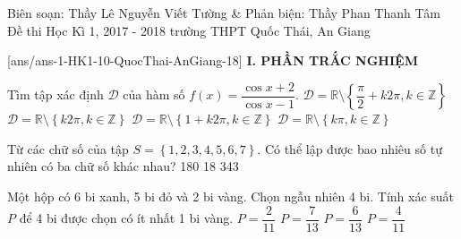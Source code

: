 
	\begin{name}
{Biên soạn: Thầy Lê Nguyễn Viết Tường \& Phản biện: Thầy Phan Thanh Tâm}
		{Đề thi Học Kì 1, 2017 - 2018 trường THPT Quốc Thái, An Giang}
	\end{name}
	\setcounter{ex}{0}\setcounter{bt}{0}
	[ans/ans-1-HK1-10-QuocThai-AnGiang-18]
\noindent\textbf{I. PHẦN TRẮC NGHIỆM}
\begin{ex}%
Tìm tập xác định $\mathscr D$ của hàm số $f(x)=\dfrac{\cos x+2}{\cos x-1}$.
\choice
{$\mathscr D=\mathbb{R} \setminus \left\{\dfrac{\pi}{2}+k2\pi,k\in \mathbb{Z}\right\}$}
{\True $\mathscr D=\mathbb{R}\setminus \left\{k2\pi,k\in \mathbb{Z}\right\}$}
{$\mathscr D=\mathbb{R}\setminus \left\{1+k2\pi,k\in \mathbb{Z}\right\}$}
{$\mathscr D=\mathbb{R}\setminus \left\{k\pi,k\in \mathbb{Z}\right\}$}
\end{ex}
\begin{ex}%
Từ các chữ số của tập $S=\left\{1,2,3,4,5,6,7\right\}$. Có thể lập được bao nhiêu số tự nhiên có ba chữ số khác nhau?
\choice
{}
{180}
{18}
{343}
\end{ex}
\begin{ex}%
Một hộp có 6 bi xanh, 5 bi đỏ và 2 bi vàng. Chọn ngẫu nhiên 4 bi. Tính xác suất $P$ để 4 bi được chọn có ít nhất 1 bi vàng.
\choice
{$P=\dfrac{2}{11}$}
{\True $P=\dfrac{7}{13}$}
{$P=\dfrac{6}{13}$}
{$P=\dfrac{4}{11}$}
\end{ex}

